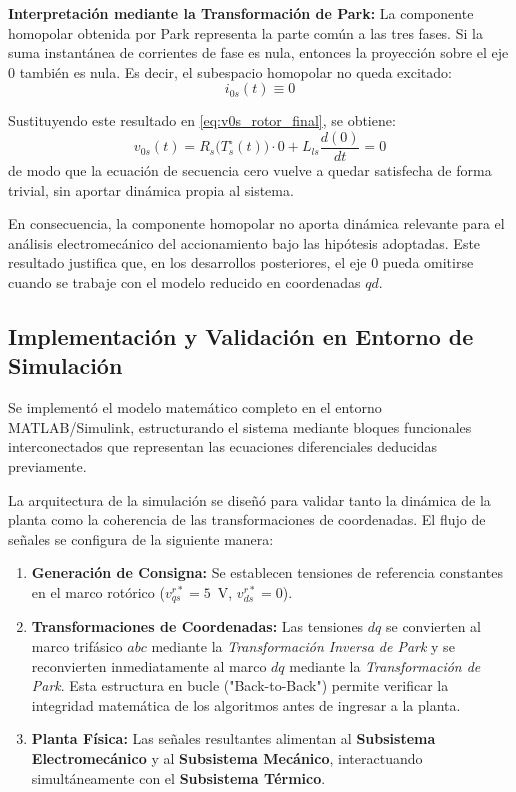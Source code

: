 \documentclass[12pt, a4paper,journal, onecolumn, compsoc]{IEEEtran}
\begin{document}
    \textbf{Interpretación mediante la Transformación de Park:}
    La componente homopolar obtenida por Park representa la parte común a las tres fases. Si la suma instantánea de corrientes de fase es nula, entonces la proyección sobre el eje \(0\) también es nula. Es decir, el subespacio homopolar no queda excitado:
    \begin{equation}
        i_{0s}(t)\equiv 0
    \end{equation}

    Sustituyendo este resultado en \eqref{eq:v0s_rotor_final}, se obtiene:
    \begin{equation}
        v_{0s}(t)=R_s\!\big(T_s^\circ(t)\big)\cdot 0 + L_{ls}\frac{d(0)}{dt}=0
    \end{equation}
    de modo que la ecuación de secuencia cero vuelve a quedar satisfecha de forma trivial, sin aportar dinámica propia al sistema.

    En consecuencia, la componente homopolar no aporta dinámica relevante para el análisis electromecánico del accionamiento bajo las hipótesis adoptadas. Este resultado justifica que, en los desarrollos posteriores, el eje \(0\) pueda omitirse cuando se trabaje con el modelo reducido en coordenadas \(qd\).


\subsection{Implementación y Validación en Entorno de Simulación}
Se implementó el modelo matemático completo en el entorno MATLAB/Simulink, estructurando el sistema mediante bloques funcionales interconectados que representan las ecuaciones diferenciales deducidas previamente.

La arquitectura de la simulación se diseñó para validar tanto la dinámica de la planta como la coherencia de las transformaciones de coordenadas. El flujo de señales se configura de la siguiente manera:
\begin{enumerate}
    \item \textbf{Generación de Consigna:} Se establecen tensiones de referencia constantes en el marco rotórico ($v_{qs}^{r*}=5$~V, $v_{ds}^{r*}=0$).
    \item \textbf{Transformaciones de Coordenadas:} Las tensiones $dq$ se convierten al marco trifásico $abc$ mediante la \textit{Transformación Inversa de Park} y se reconvierten inmediatamente al marco $dq$ mediante la \textit{Transformación de Park}. Esta estructura en bucle ("Back-to-Back") permite verificar la integridad matemática de los algoritmos antes de ingresar a la planta.
    \item \textbf{Planta Física:} Las señales resultantes alimentan al \textbf{Subsistema Electromecánico} y al \textbf{Subsistema Mecánico}, interactuando simultáneamente con el \textbf{Subsistema Térmico}.
\end{enumerate}
\end{document}
